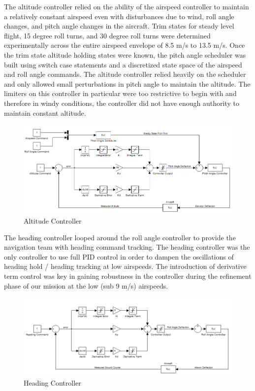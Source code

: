\documentclass[11pt]{article}
\begin{document}
The altitude controller relied on the ability of the airspeed controller to maintain a relatively constant airspeed even with disturbances due to wind, roll angle changes, and pitch angle changes in the aircraft. Trim states for steady level flight, 15 degree roll turns, and 30 degree roll turns were determined experimentally across the entire airspeed envelope of 8.5 m/s to 13.5 m/s. Once the trim state altitude holding states were known, the pitch angle scheduler was built using switch case statements and a discretized state space of the airspeed and roll angle commands. The altitude controller relied heavily on the scheduler and only allowed small perturbations in pitch angle to maintain the altitude. The limiters on this controller in particular were too restrictive to begin with and therefore in windy conditions, the controller did not have enough authority to maintain constant altitude.

\begin{figure}[h!]
\centering
\includegraphics[width=\textwidth]{./Figures/AltitudeController}
\caption{Altitude Controller}
\label{fig:AltitudeController}
\end{figure}

The heading controller looped around the roll angle controller to provide the navigation team with heading command tracking. The heading controller was the only controller to use full PID control in order to dampen the oscillations of heading hold / heading tracking at low airspeeds. The introduction of derivative term control was key in gaining robustness in the controller during the refinement phase of our mission at the low (sub 9 m/s) airspeeds.

\begin{figure}[h!]
\centering
\includegraphics[width=\textwidth]{./Figures/HeadingController}
\caption{Heading Controller}
\label{fig:HeadingController}
\end{figure}
\end{document}
